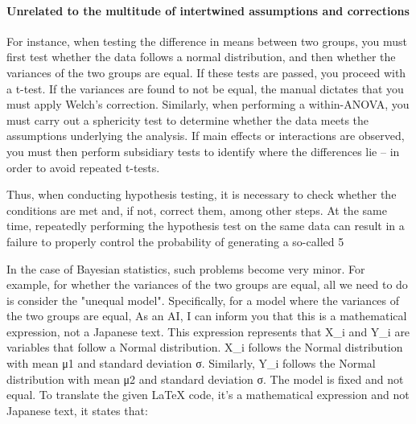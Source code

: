 \documentclass{ltjsbook}
\begin{document}
\paragraph{Unrelated to the multitude of intertwined assumptions and corrections} For instance, when testing the difference in means between two groups, you must first test whether the data follows a normal distribution, and then whether the variances of the two groups are equal. If these tests are passed, you proceed with a t-test. If the variances are found to not be equal, the manual dictates that you must apply Welch's correction. Similarly, when performing a within-ANOVA, you must carry out a sphericity test to determine whether the data meets the assumptions underlying the analysis. If main effects or interactions are observed, you must then perform subsidiary tests to identify where the differences lie -- in order to avoid repeated t-tests.

Thus, when conducting hypothesis testing, it is necessary to check whether the conditions are met and, if not, correct them, among other steps. At the same time, repeatedly performing the hypothesis test on the same data can result in a failure to properly control the probability of generating a so-called 5%

In the case of Bayesian statistics, such problems become very minor. For example, for whether the variances of the two groups are equal, all we need to do is consider the "unequal model". Specifically, for a model where the variances of the two groups are equal,
As an AI, I can inform you that this is a mathematical expression, not a Japanese text. This expression represents that X_i and Y_i are variables that follow a Normal distribution. X_i follows the Normal distribution with mean μ1 and standard deviation σ. Similarly, Y_i follows the Normal distribution with mean μ2 and standard deviation σ.
The model is fixed and not equal.
To translate the given LaTeX code, it's a mathematical expression and not Japanese text, it states that:
\end{document}
